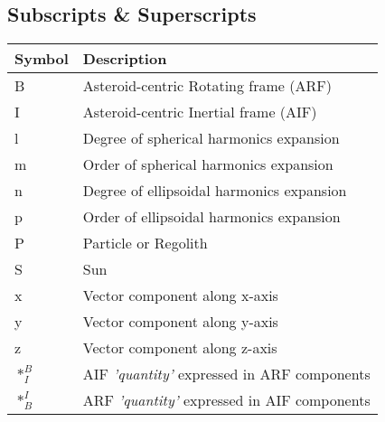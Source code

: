 \subsection*{Subscripts \& Superscripts}
\begin{longtable}[l]{p{100pt} p{230pt}}
    \textbf{Symbol} & \textbf{Description}                                              \\
    \hline
    B                                 & Asteroid-centric Rotating frame (ARF)           \\
    I                                 & Asteroid-centric Inertial frame (AIF)           \\
    l                                 & Degree of spherical harmonics expansion         \\
    m                                 & Order of spherical harmonics expansion          \\
    n                                 & Degree of ellipsoidal harmonics expansion       \\
    p                                 & Order of ellipsoidal harmonics expansion        \\
    P                                 & Particle or Regolith                            \\
    S                                 & Sun                                             \\
    x                                 & Vector component along x-axis                   \\
    y                                 & Vector component along y-axis                   \\
    z                                 & Vector component along z-axis                   \\
    $\ast_{I}^{B}$                    & AIF \textit{'quantity'} expressed
                                        in ARF components                               \\
    $\ast_{B}^{I}$                    & ARF \textit{'quantity'} expressed
                                        in AIF components                               \\
\end{longtable}
